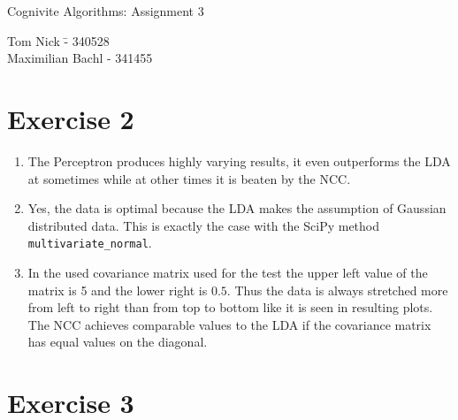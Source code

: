 \documentclass[a4paper,10pt]{article}
\begin{document}
\begin{center}
\Large{Cognivite Algorithms: Assignment 3} \\
\end{center}
\begin{tabbing}
Tom Nick \hspace{2cm}\= - 340528\\
Maximilian Bachl \> - 341455 \\
\end{tabbing}

\section*{Exercise 2}
\begin{enumerate}
    \item The Perceptron produces highly varying results, it even outperforms the LDA at sometimes while at other times it is beaten by the NCC. 
    \item Yes, the data is optimal because the LDA makes the assumption of Gaussian distributed data. This is exactly the case with the SciPy method \texttt{multivariate\_normal}.
    \item In the used covariance matrix used for the test the upper left value of the matrix is 5 and the lower right is $0.5$. Thus the data is always stretched more from left to right than from top to bottom like it is seen in resulting plots. The NCC achieves comparable values to the LDA if the covariance matrix has equal values on the diagonal.
\end{enumerate}
\section*{Exercise 3}
\end{document}
